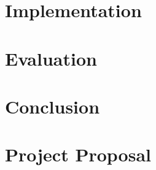 \documentclass[12pt,twoside,notitlepage,a4paper]{report}
\begin{document}
\chapter{Implementation}

\cleardoublepage

\chapter{Evaluation}

\cleardoublepage

\chapter{Conclusion}

\cleardoublepage



\cleardoublepage

\appendix
\chapter{Project Proposal}


\end{document}

